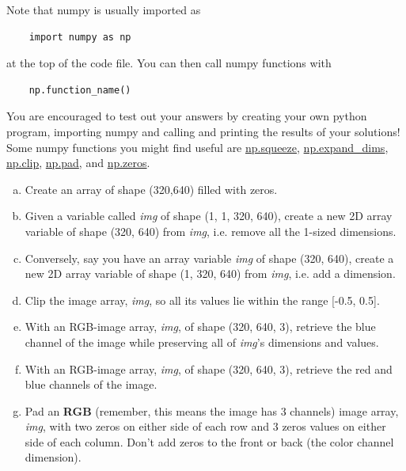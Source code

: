 Note that numpy is usually imported as
\begin{verbatim}
    import numpy as np
\end{verbatim}
at the top of the code file. You can then call numpy functions with \begin{verbatim}
    np.function_name()
\end{verbatim}
You are encouraged to test out your answers by creating your own python program, importing numpy and calling and printing the results of your solutions! Some numpy functions you might find useful are \href{https://numpy.org/doc/stable/reference/generated/numpy.squeeze.html}{np.squeeze}, \href{https://numpy.org/doc/stable/reference/generated/numpy.expand_dims.html}{np.expand\_dims}, \href{https://numpy.org/doc/stable/reference/generated/numpy.clip.html}{np.clip}, \href{https://numpy.org/doc/stable/reference/generated/numpy.pad.html}{np.pad}, and \href{https://numpy.org/doc/stable/reference/generated/numpy.zeros.html}{np.zeros}.

\begin{enumerate}[a.]
    \item Create an array of shape (320,640) filled with zeros.
    \item Given a variable called \emph{img} of shape (1, 1, 320, 640), create a new 2D array variable of shape (320, 640) from \emph{img}, i.e. remove all the 1-sized dimensions. 
    \item Conversely, say you have an array variable \emph{img} of shape (320, 640), create a new 2D array variable of shape (1, 320, 640) from \emph{img}, i.e. add a dimension. 
    \item Clip the image array, \emph{img}, so all its values lie within the range [-0.5, 0.5].
    \item With an RGB-image array, \emph{img}, of shape (320, 640, 3), retrieve the blue channel of the image while preserving all of \emph{img}'s dimensions and values. 
    \item With an RGB-image array, \emph{img}, of shape (320, 640, 3), retrieve the red and blue channels of the image. 
    \item Pad an \textbf{RGB} (remember, this means the image has 3 channels) image array, \emph{img}, with two zeros on either side of each row and 3 zeros values on either side of each column. Don't add zeros to the front or back (the color channel dimension).
\end{enumerate}


\pagebreak
